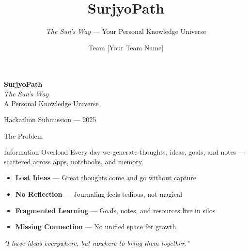\documentclass[aspectratio=43, 11pt]{beamer}
\title{\textbf{\textcolor{StarGold}{SurjyoPath}}}
\subtitle{\textit{The Sun's Way} — Your Personal Knowledge Universe}
\author{Team [Your Team Name]}
\date{}
\begin{document}
\begin{frame}[plain]
  \vspace{1.5cm}
  \centering
  {\Huge \textbf{\textcolor{StarGold}{SurjyoPath}} \\[0.2cm]}
  {\large \textcolor{Corona}{\textit{The Sun's Way}}}\\[0.4cm]
  {\normalsize \textcolor{DustGray}{A Personal Knowledge Universe}}\\[1cm]

  \begin{center}
  \end{center}

  \vspace{1cm}
  {\small \textcolor{DustGray}{Hackathon Submission --- 2025}}
\end{frame}

\begin{frame}{\textcolor{StarGold}{The Problem}}
  \begin{block}{\textcolor{SunGlow}{Information Overload}}
    Every day we generate thoughts, ideas, goals, and notes --- scattered across apps, notebooks, and memory.
  \end{block}

  \vspace{0.4cm}
  \begin{itemize}
    \item[\textcolor{SunGlow}{$\bullet$}] \textbf{Lost Ideas} --- Great thoughts come and go without capture
    \item[\textcolor{SunGlow}{$\bullet$}] \textbf{No Reflection} --- Journaling feels tedious, not magical
    \item[\textcolor{SunGlow}{$\bullet$}] \textbf{Fragmented Learning} --- Goals, notes, and resources live in silos
    \item[\textcolor{SunGlow}{$\bullet$}] \textbf{Missing Connection} --- No unified space for growth
  \end{itemize}

  \vspace{0.4cm}
  \begin{alertblock}{}
    \centering
    \textit{"I have ideas everywhere, but nowhere to bring them together."}
  \end{alertblock}
\end{frame}
\end{document}
